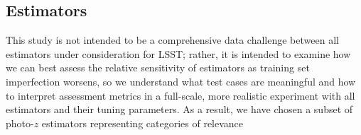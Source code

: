 \documentclass[fleqn,usenatbib,useAMS]{mnras}
\newcommand{\PersonalTag}[3]{{\color{#2}{$^{#1}$ [#3}]}}
\newcommand{\aim}[1]{\PersonalTag{Alex}{violet}{#1}}
\newcommand{\refresponse}[1]{{\color{black}{#1}}}
\begin{document}

\subsection{Estimators}
\label{sec:estimators}



This study is not intended to be a comprehensive data challenge between all estimators under consideration for LSST;
rather, it is intended to examine how we can best assess the relative sensitivity of estimators as training set imperfection worsens, so we understand what test cases are meaningful and how to interpret assessment metrics in a full-scale, more realistic experiment with all estimators and their tuning parameters.
As a result, we have chosen a subset of photo-$z$ estimators representing categories of relevance\refresponse{:}
%
%
\end{document}

